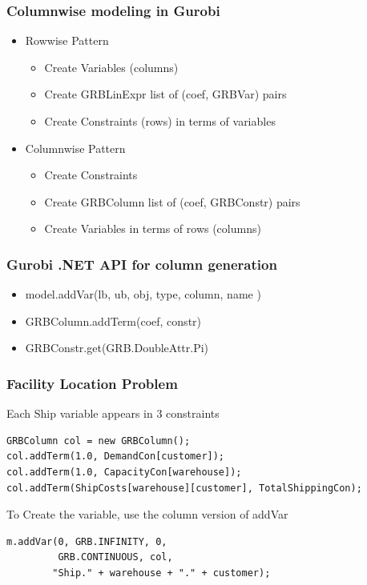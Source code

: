 \documentclass[12pt,handout]{beamer}
\begin{document}
\begin{frame}
\frametitle {Columnwise modeling in Gurobi}
\begin{itemize}
  \item Rowwise Pattern
  \begin{itemize}
    \item Create Variables (columns)
    \item Create GRBLinExpr list of (coef, GRBVar) pairs
    \item Create Constraints (rows) in terms of variables
  \end{itemize}
  \item Columnwise Pattern
  \begin{itemize}
    \item Create Constraints
    \item Create GRBColumn list of (coef, GRBConstr) pairs
    \item Create Variables in terms of rows (columns)
  \end{itemize}
\end{itemize}
\end{frame}


\begin{frame}
\frametitle{Gurobi .NET API for column generation}
\begin{itemize}
\item model.addVar(lb, ub, obj, type, column, name )
\item GRBColumn.addTerm(coef, constr)
\item GRBConstr.get(GRB.DoubleAttr.Pi)
\end{itemize}
\end{frame}

\begin{frame}[containsverbatim]
  \frametitle{Facility Location Problem}
  Each Ship variable appears in 3 constraints
{\small
\begin{verbatim}
GRBColumn col = new GRBColumn();
col.addTerm(1.0, DemandCon[customer]);
col.addTerm(1.0, CapacityCon[warehouse]);
col.addTerm(ShipCosts[warehouse][customer], TotalShippingCon);
\end{verbatim}
}

To Create the variable, use the column version of addVar
\begin{verbatim}
m.addVar(0, GRB.INFINITY, 0,
         GRB.CONTINUOUS, col,
        "Ship." + warehouse + "." + customer);
\end{verbatim}
\end{frame}
\end{document}
